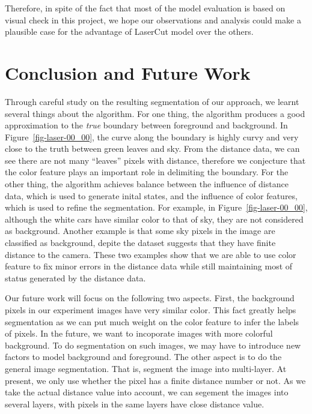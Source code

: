 \documentclass{article} %
\begin{document}
Therefore, in spite of the fact that most of the model evaluation is based on visual check in this project, we hope our observations and analysis could make a plausible case for the advantage of LaserCut model over the others.

\section{Conclusion and Future Work}

Through careful study on the resulting segmentation of our approach,
we learnt several things about the algorithm.
For one thing, the algorithm produces a good approximation to the
\emph{true} boundary between foreground and background. 
In Figure~\ref{fig-laser-00_00}, the curve along the boundary is highly curvy and very close to
the truth between green leaves and sky. From the distance
data, we can see there are not many ``leaves'' pixels with distance,
therefore we conjecture that the color feature plays an important role
in delimiting the boundary.
For the other thing, the algorithm achieves balance between the
influence of distance data, which is used to generate inital states,
and the influence of color features, which is used to refine the
segmentation. 
For example, in Figure~\ref{fig-laser-00_00}, although the white cars have similar color
to that of sky, they are not considered as background.  
Another example is that some sky pixels in the image are classified
as background, depite the dataset suggests that they have finite
distance to the camera.  
These two examples show that we are able to use color feature to fix
minor errors in the distance data while still maintaining most of
status generated by the distance data.

Our future work will focus on the following two aspects.
First, the background pixels in our experiment images have very
similar color. This fact greatly helps segmentation as we can put much
weight on the color feature to infer the labels of pixels. In the
future, we want to incoporate images with more colorful
background. To do segmentation on such images, we may have to
introduce new factors to model background and foreground.
The other aspect is to do the general image segmentation. That is,
segment the image into multi-layer. At present, we only use whether
the pixel has a finite distance number or not. As we take the actual
distance value into account, we can segement the images into several
layers, with pixels in the same layers have close distance value.
\end{document}
